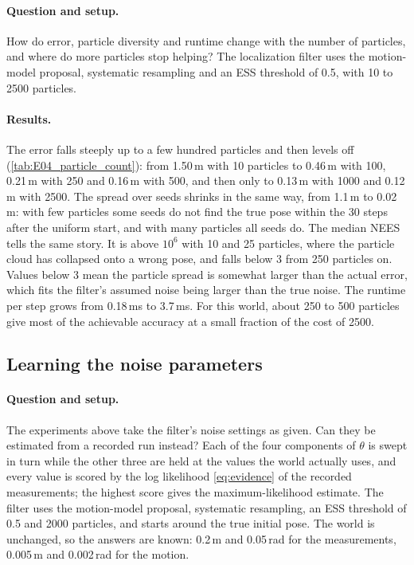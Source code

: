 \paragraph{Question and setup.} How do error, particle diversity and runtime change with the number of particles, and
where do more particles stop helping? The localization filter uses the motion-model proposal, systematic resampling and
an ESS threshold of 0.5, with 10 to 2500 particles.

\paragraph{Results.} The error falls steeply up to a few hundred particles and then levels off
(\cref{tab:E04_particle_count}): from 1.50\,m with 10 particles to 0.46\,m with 100, 0.21\,m with 250 and 0.16\,m with 500,
and then only to 0.13\,m with 1000 and 0.12\,m with 2500. The spread over seeds shrinks in the same way, from 1.1\,m
to 0.02\,m: with few particles some seeds do not find the true pose within the 30 steps after the uniform start, and
with many particles all seeds do. The median NEES tells the same story. It is above $10^6$ with 10 and 25 particles, where the particle cloud
has collapsed onto a wrong pose, and falls below 3 from 250 particles on. Values below 3 mean the particle spread is
somewhat larger than the actual error, which fits the filter's assumed noise being larger than the true noise. The
runtime per step grows from 0.18\,ms to 3.7\,ms. For this world, about 250 to 500 particles give most of the achievable
accuracy at a small fraction of the cost of 2500.


\subsection{Learning the noise parameters}\label{sec:e11}

\paragraph{Question and setup.} The experiments above take the filter's noise settings as given. Can they be
estimated from a recorded run instead? Each of the four components of $\theta$ is swept in turn while the other
three are held at the values the world actually uses, and every value is scored by the log likelihood
\eqref{eq:evidence} of the recorded measurements; the highest score gives the maximum-likelihood estimate. The
filter uses the motion-model proposal, systematic resampling, an ESS threshold of 0.5 and 2000 particles, and
starts around the true initial pose. The world is unchanged, so the answers are known: 0.2\,m and 0.05\,rad for the
measurements, 0.005\,m and 0.002\,rad for the motion.

